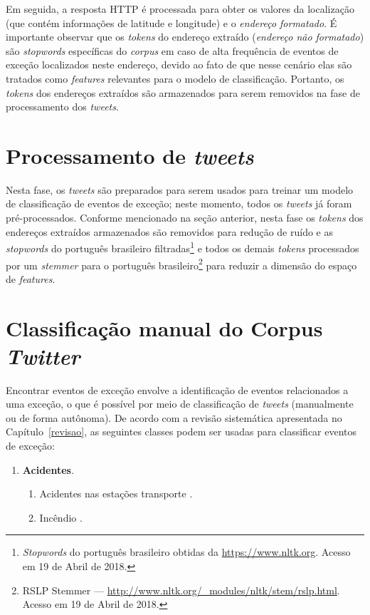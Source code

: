 \documentclass[
	12pt,				%
	oneside,			%
	a4paper,			%
	english,			%
	brazil				%
	]{abntex2ppgsi}
\begin{document}
{{Em seguida, a resposta HTTP é processada para obter os valores da localização (que contém informações de latitude e longitude) e o \emph{endereço formatado}. É importante observar que os \textit{tokens} do endereço extraído (\emph{endereço não formatado}) são \textit{stopwords} específicas do \textit{corpus} em caso de alta frequência de eventos de exceção localizados neste endereço, devido ao fato de que nesse cenário elas são tratados como \textit{features} relevantes para o modelo de classificação. Portanto, os \textit{tokens} dos endereços extraídos são armazenados para serem removidos na fase de processamento dos \textit{tweets}.

\section{Processamento de \textit{tweets}}
\label{processing}

Nesta fase, os \textit {tweets} são preparados para serem usados para treinar um modelo de classificação de eventos de exceção; neste momento, todos os \textit {tweets} já foram pré-processados. Conforme mencionado na seção anterior, nesta fase os \textit{tokens} dos endereços extraídos armazenados são removidos para redução de ruído e as \textit{stopwords} do português brasileiro filtradas\footnote{\textit{Stopwords} do português brasileiro obtidas da  \url{https://www.nltk.org}. Acesso em 19 de Abril de 2018.} e todos os demais \textit{tokens}  processados por um \textit{stemmer} para o  português brasileiro\footnote{RSLP Stemmer --- \url {http://www.nltk.org/\_modules/nltk/stem/rslp.html}. Acesso em 19 de Abril de 2018.} para reduzir a dimensão do espaço de \textit{features}.

\section{Classificação manual do Corpus \textit{Twitter}}
\label{manualClassification}

Encontrar eventos de exceção envolve a identificação de eventos relacionados a uma exceção, o que é possível por meio de classificação de \textit{tweets} (manualmente ou de forma autônoma). De acordo com a revisão sistemática apresentada no Capítulo~\ref{revisao}, as seguintes classes podem ser usadas para classificar eventos de exceção:

\begin{enumerate}
\item \textbf{Acidentes}.
\begin{enumerate}
\item Acidentes nas estações transporte \cite{Itoh2016}.
\item Incêndio \cite{Itoh2016}.
\end{enumerate}


\end{enumerate}}}
\end{document}
